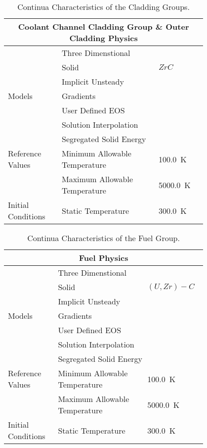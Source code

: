 \documentclass[8pt,a5paper]{article}
\begin{document}
\begin{table}[h!]
    \label{table: Table 2}
    \centering
    \small
    \caption{Continua Characteristics of the Cladding Groups.}
    \begin{tabular}{|m{0.2\linewidth}|m{0.4\linewidth}|m{0.2\linewidth}|}
    \hline
    \multicolumn{3}{|c|}{\textbf{Coolant Channel Cladding Group \& Outer Cladding Physics}}\\\hline
    & \multicolumn{2}{l|}{Three Dimenstional}\\\cline{2-3}
    & Solid & $ZrC$\\\cline{2-3}
    & \multicolumn{2}{l|}{Implicit Unsteady}\\\cline{2-3}
    Models & \multicolumn{2}{l|}{Gradients}\\\cline{2-3}
    & \multicolumn{2}{l|}{User Defined EOS}\\\cline{2-3}
    & \multicolumn{2}{l|}{Solution Interpolation}\\\cline{2-3}
    & \multicolumn{2}{l|}{Segregated Solid Energy}\\\hline
    Reference Values & Minimum Allowable Temperature & \SI{100.0}{K}\\\cline{2-3}
    & Maximum Allowable Temperature & \SI{5000.0}{K}\\\hline
    Initial Conditions & Static Temperature & \SI{300.0}{K}\\\hline
    \end{tabular}
\end{table}

\vspace{-0.25in}

\begin{table}[h!]
    \label{table: Table 3}
    \centering
    \small
    \caption{Continua Characteristics of the Fuel Group.}
    \begin{tabular}{|m{0.2\linewidth}|m{0.4\linewidth}|m{0.2\linewidth}|}
    \hline
    \multicolumn{3}{|c|}{\textbf{Fuel Physics}}\\\hline
    & \multicolumn{2}{l|}{Three Dimenstional}\\\cline{2-3}
    & Solid & $(U, Zr)-C$\\\cline{2-3}
    & \multicolumn{2}{l|}{Implicit Unsteady}\\\cline{2-3}
    Models & \multicolumn{2}{l|}{Gradients}\\\cline{2-3}
    & \multicolumn{2}{l|}{User Defined EOS}\\\cline{2-3}
    & \multicolumn{2}{l|}{Solution Interpolation}\\\cline{2-3}
    & \multicolumn{2}{l|}{Segregated Solid Energy}\\\hline
    Reference Values & Minimum Allowable Temperature & \SI{100.0}{K}\\\cline{2-3}
    & Maximum Allowable Temperature & \SI{5000.0}{K}\\\hline
    Initial Conditions & Static Temperature & \SI{300.0}{K}\\\hline
    \end{tabular}
\end{table}
\end{document}
